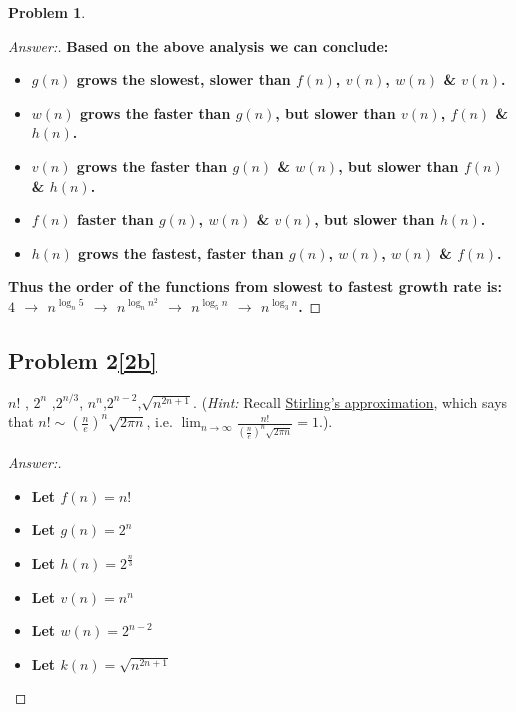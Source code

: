 \documentclass[11pt]{article}
\theoremstyle{definition}
\theoremstyle{definition}
\newtheorem{required}{Problem}
\theoremstyle{definition}
\begin{document}
\begin{required}
\begin{enumerate}[label=(\alph*)]
\begin{proof}[Answer:]
\item \textbf{Based on the above analysis we can conclude:}
\begin{itemize}
\item \textbf{$g(n)$ grows the slowest, slower than $f(n)$, $v(n)$, $w(n)$ \& $v(n)$.}
\item \textbf{$w(n)$ grows the faster than $g(n)$, but slower than $v(n)$, $f(n)$ \& $h(n)$.}
\item \textbf{$v(n)$ grows the faster than $g(n)$ \& $w(n)$, but slower than $f(n)$ \& $h(n)$.}
\item \textbf{$f(n)$ faster than $g(n)$, $w(n)$ \& $v(n)$, but slower than $h(n)$.}
\item \textbf{$h(n)$ grows the fastest, faster than $g(n)$, $w(n)$, $w(n)$ \& $f(n)$.}
\end{itemize}
\item \textbf{Thus the order of the functions from slowest to fastest growth rate is: $4$ $\to$ $n^{\log_n 5}$ $\to$ $n^{\log_n n^2}$ $\to$ $n^{\log_5 n}$ $\to$ $n^{\log_3 n}$.}

        \end{proof}
        \newpage

\subsection{Problem 2\ref{2b}}
        \item \label{2b} $n!$ , \qquad $2^n$ ,\qquad  $2^{n/3}$, \qquad  $n^n$,\qquad $2^{n-2}$,\qquad  $\sqrt{n^{2n+1}}$. (\emph{Hint:} Recall \href{https://en.wikipedia.org/wiki/Stirling\%27s_approximation}{Stirling's approximation}, which says that $n! \sim \left(\frac{n}{e}\right)^n \sqrt{2 \pi n}$, i.e. $\lim_{n \to \infty} \frac{n!}{\left(\frac{n}{e}\right)^n \sqrt{2 \pi n}} = 1$.).
        \begin{proof}[Answer:] \

\begin{itemize}
\item \textbf{Let $f(n) = n!$}
\item \textbf{Let $g(n) = 2^n$}
\item \textbf{Let $h(n) = 2^{\frac{n}{3}}$}
\item \textbf{Let $v(n) = n^n$}
\item \textbf{Let $w(n) = 2^{n-2}$}
\item \textbf{Let $k(n) = \sqrt{n^{2n+1}}$}
\end{itemize}


\end{proof}
\end{enumerate}
\end{required}
\end{document}
